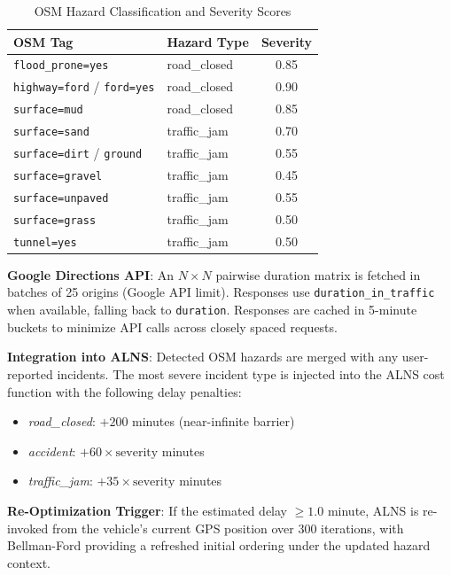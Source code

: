 \documentclass[conference]{IEEEtran}
\begin{document}
\begin{table}[H]
\centering
\caption{OSM Hazard Classification and Severity Scores}
\label{tab:hazard}
\begin{tabular}{|l|l|c|}
\hline
\textbf{OSM Tag} & \textbf{Hazard Type} & \textbf{Severity} \\ \hline
\texttt{flood\_prone=yes}                    & road\_closed  & 0.85 \\ \hline
\texttt{highway=ford} / \texttt{ford=yes}   & road\_closed  & 0.90 \\ \hline
\texttt{surface=mud}                         & road\_closed  & 0.85 \\ \hline
\texttt{surface=sand}                        & traffic\_jam  & 0.70 \\ \hline
\texttt{surface=dirt} / \texttt{ground}     & traffic\_jam  & 0.55 \\ \hline
\texttt{surface=gravel}                      & traffic\_jam  & 0.45 \\ \hline
\texttt{surface=unpaved}                     & traffic\_jam  & 0.55 \\ \hline
\texttt{surface=grass}                       & traffic\_jam  & 0.50 \\ \hline
\texttt{tunnel=yes}                          & traffic\_jam  & 0.50 \\ \hline
\end{tabular}
\end{table}

\textbf{Google Directions API}: An $N \times N$ pairwise duration matrix is
fetched in batches of 25 origins (Google API limit). Responses use
\texttt{duration\_in\_traffic} when available, falling back to
\texttt{duration}. Responses are cached in 5-minute buckets to minimize API
calls across closely spaced requests.

\textbf{Integration into ALNS}: Detected OSM hazards are merged with any
user-reported incidents. The most severe incident type is injected into the
ALNS cost function with the following delay penalties:
\begin{itemize}
\item \textit{road\_closed}: $+200$ minutes (near-infinite barrier)
\item \textit{accident}: $+60 \times \text{severity}$ minutes
\item \textit{traffic\_jam}: $+35 \times \text{severity}$ minutes
\end{itemize}

\textbf{Re-Optimization Trigger}: If the estimated delay $\geq 1.0$ minute,
ALNS is re-invoked from the vehicle's current GPS position over 300
iterations, with Bellman-Ford providing a refreshed initial ordering under
the updated hazard context.
\end{document}
